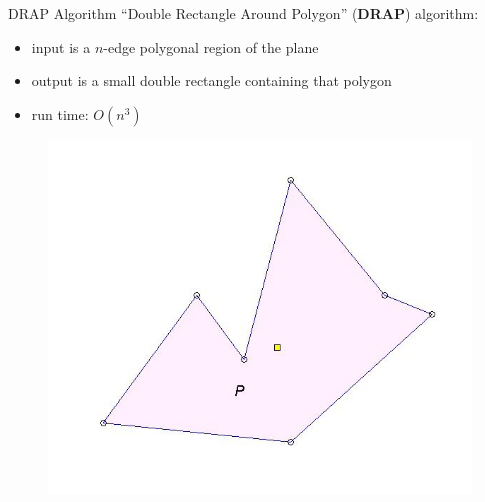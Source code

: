\documentclass[10pt]{beamer}
\begin{document}
\begin{frame}{DRAP Algorithm}
  ``Double Rectangle Around Polygon'' (\textbf{DRAP}) algorithm:\\
  \begin{itemize}
  \item input is a $n$-edge polygonal region of the plane
  \item output is a small double rectangle containing that polygon
  \item run time: $O(n^3)$
  \end{itemize}
  \begin{figure}
    \includegraphics[scale=0.3]{figs/drapP.jpg}
  \end{figure}
\end{frame}
\end{document}
